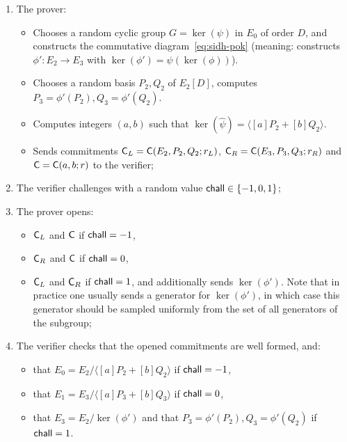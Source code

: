 \begin{enumerate}
    \item The prover:
    \begin{itemize}
        \item Chooses a random cyclic group $G = \ker(\psi)$ in $E_0$ of order $D$, and constructs the commutative diagram~\eqref{eq:sidh-pok} (meaning: constructs $\phi' : E_2 \to E_3$ with $\ker(\phi') = \psi( \ker( \phi ))$).
        \item Chooses a random basis $P_2,Q_2$ of $E_2[D]$, computes $P_3 = \phi'(P_2), Q_3 = \phi'(Q_2)$.
        \item Computes integers $(a,b)$ such that $\ker(\widehat\psi) = \langle [a]P_2 + [b]Q_2\rangle$.
        \item Sends commitments $\mathsf{C}_L = \mathsf{C}(E_2,P_2,Q_2; r_L)$, $\mathsf{C}_R = \mathsf{C}(E_3,P_3,Q_3; r_R)$ and $\mathsf{C} = \mathsf{C}(a,b; r)$ to the verifier;
    \end{itemize}
    \item The verifier challenges with a random value $\mathsf{chall}\in\{-1,0,1\}$;
    \item The prover opens:
    \begin{itemize}
        \item $\mathsf{C}_L$ and $\mathsf{C}$ if $\mathsf{chall} = -1$,
        \item $\mathsf{C}_R$ and $\mathsf{C}$ if $\mathsf{chall} = 0$,
        \item $\mathsf{C}_L$ and $\mathsf{C}_R$ if $\mathsf{chall} = 1$, and additionally sends $\ker(\phi')$.
        Note that in practice one usually sends a generator for $\ker(\phi')$, in which case this generator should be sampled uniformly from the set of all generators of the subgroup;
    \end{itemize}
    \item The verifier checks that the opened commitments are well formed, and:
    \begin{itemize}
        \item that $E_0 = E_2/\langle [a]P_2 + [b]Q_2\rangle$ if $\mathsf{chall} = -1$,
        \item that $E_1 = E_3/\langle [a]P_3 + [b]Q_3\rangle$ if $\mathsf{chall} = 0$,
        \item that $E_3 = E_2/\ker(\phi')$ and that $P_3 = \phi'(P_2), Q_3 = \phi'(Q_2)$ if $\mathsf{chall} = 1$.
    \end{itemize}
\end{enumerate}



